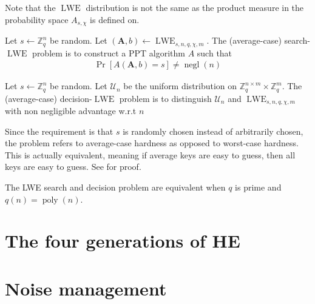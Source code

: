 Note that the $\operatorname{LWE}$ distribution is not the same as the product measure in the probability space $A_{s,\chi}$ is defined on.

\begin{definition}
    Let $s \leftarrow \mathbb{Z}_q^n$ be random.
    Let $(\textbf{A}, b) \leftarrow \operatorname{LWE}_{s, n, q, \chi, m}$. The (average-case) search-$\operatorname{LWE}$ problem is to construct a PPT algorithm $A$ such that
    \begin{equation}
        \begin{aligned}
            \operatorname{Pr}[A(\textbf{A}, b) = s] \neq \operatorname{negl}(n)
        \end{aligned}
    \end{equation}
\end{definition}

\begin{definition}
    Let $s \leftarrow \mathbb{Z}_q^n$ be random.
    Let $\mathcal{U}_n$ be the uniform distribution on $\mathbb{Z}_q^{n \times m} \times \mathbb{Z}_q^m$. The (average-case) decision-$\operatorname{LWE}$ problem is to distinguish $\mathcal{U}_n$ and $\operatorname{LWE}_{s, n, q, \chi, m}$ with non negligible advantage w.r.t $n$
\end{definition}
\begin{remark}
    Since the requirement is that $s$ is randomly chosen instead of arbitrarily chosen, the problem refers to average-case hardness as opposed to worst-case hardness. This is actually equivalent, meaning if average keys are easy to guess, then all keys are easy to guess. See \cite{Reg10} for proof.
\end{remark}

The LWE search and decision problem are equivalent when $q$ is prime and $q(n) = \operatorname{poly}(n)$.

\section{The four generations of HE}

\section{Noise management}

